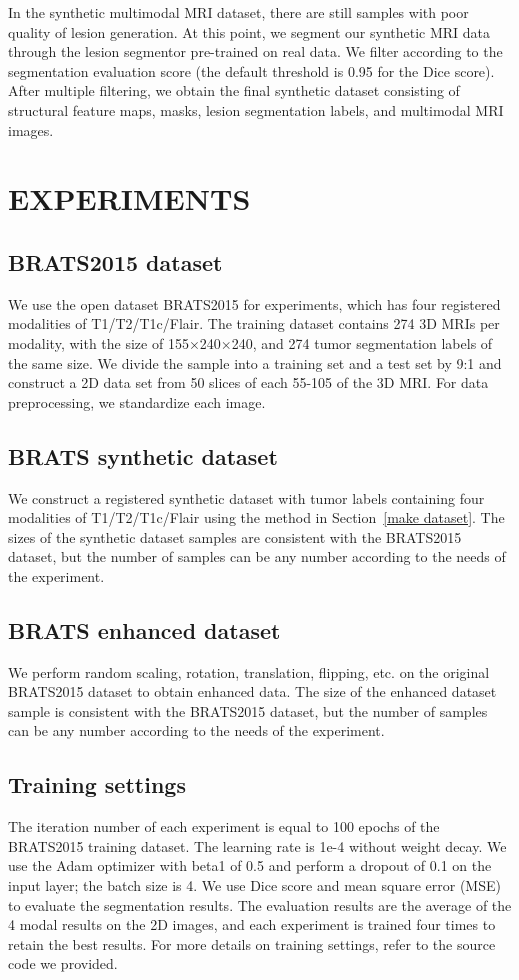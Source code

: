 \documentclass{ecai}
\begin{document}
In the synthetic multimodal MRI dataset, there are still samples with poor quality of lesion generation. At this point, we segment our synthetic MRI data through the lesion segmentor pre-trained on real data. We filter according to the segmentation evaluation score (the default threshold is 0.95 for the Dice score). After multiple filtering, we obtain the final synthetic dataset consisting of structural feature maps, masks, lesion segmentation labels, and multimodal MRI images.

\section{EXPERIMENTS}

\subsection{BRATS2015 dataset}
We use the open dataset BRATS2015\cite{91menze:hal-00935640} for experiments, which has four registered modalities of T1/T2/T1c/Flair. The training dataset contains 274 3D MRIs per modality, with the size of 155$\times$240$\times$240, and 274 tumor segmentation labels of the same size. We divide the sample into a training set and a test set by 9:1 and construct a 2D data set from 50 slices of each 55-105 of the 3D MRI. For data preprocessing, we standardize each image.

\subsection{BRATS synthetic dataset}
We construct a registered synthetic dataset with tumor labels containing four modalities of T1/T2/T1c/Flair using the method in Section~\ref{make dataset}. The sizes of the synthetic dataset samples are consistent with the BRATS2015 dataset, but the number of samples can be any number according to the needs of the experiment.

\subsection{BRATS enhanced dataset}
We perform random scaling, rotation, translation, flipping, etc. on the original BRATS2015 dataset to obtain enhanced data. The size of the enhanced dataset sample is consistent with the BRATS2015 dataset, but the number of samples can be any number according to the needs of the experiment.

\subsection{Training settings}
The iteration number of each experiment is equal to 100 epochs of the BRATS2015 training dataset. The learning rate is 1e-4 without weight decay. We use the Adam optimizer with beta1 of 0.5 and perform a dropout of 0.1 on the input layer; the batch size is 4. We use Dice score \cite{95dice1945measures} and mean square error (MSE)\cite{94prasad1990the} to evaluate the segmentation results. The evaluation results are the average of the 4 modal results on the 2D images, and each experiment is trained four times to retain the best results. For more details on training settings, refer to the source code we provided.
\end{document}
